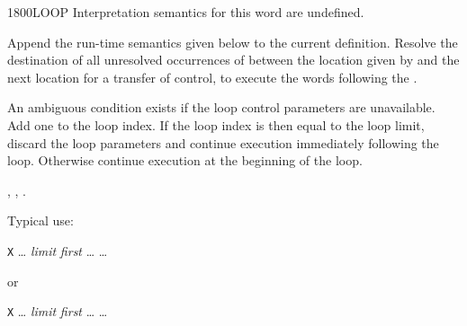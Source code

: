 \begin{worddef}{1800}{LOOP}
\interpret
	Interpretation semantics for this word are undefined.

\compile

	Append the run-time semantics given below to the current
	definition. Resolve the destination of all unresolved
	occurrences of  between the location given by
	 and the next location for a transfer of
	control, to execute the words following the .

\runtime
	\stack{}{}

	An ambiguous condition exists if the loop control parameters are
	unavailable. Add one to the loop index. If the loop index is then
	equal to the loop limit, discard the loop parameters and continue
	execution immediately following the loop. Otherwise continue
	execution at the beginning of the loop.

\see {},
	,
	.

	\begin{rationale} %
		\enlargethispage{2ex}
		Typical use:

		\tab \word{:} \texttt{X} {\ldots}
			\emph{limit} \emph{first} 
				{\ldots}
		{\ldots} \word{;}

		or

		\tab \word{:} \texttt{X} {\ldots}
			\emph{limit} \emph{first} 
				{\ldots}
		{\ldots} \word{;}
	\end{rationale}

	\begin{testing} %
		 \\
		 \\
		 \\
	\end{testing}
\end{worddef}


